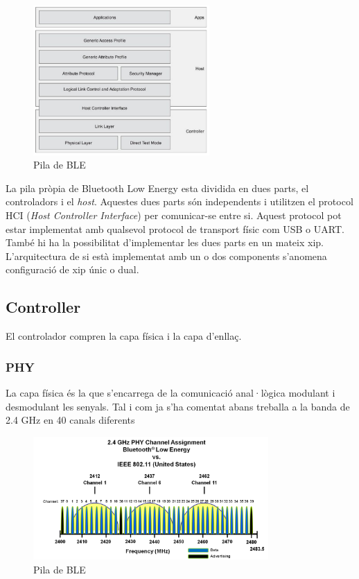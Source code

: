 \begin{figure}[h!]
	\begin{center}
		\includegraphics[width=0.6\textwidth]{./images/BLE_Stack.png}
		\caption{Pila de BLE \cite{ble_stack}}
		\label{ble_stack}
	\end{center}
\end{figure}

La pila pròpia de Bluetooth Low Energy esta dividida en dues parts, el controladors i el \textit{host}. Aquestes dues parts són independents i utilitzen el protocol HCI (\textit{Host Controller Interface}) per comunicar-se entre si. Aquest protocol pot estar implementat amb qualsevol protocol de transport físic com USB o UART. També hi ha la possibilitat d'implementar les dues parts en un mateix xip. L'arquitectura de si està implementat amb un o dos components s'anomena configuració de xip únic o dual.


\subsection{Controller}
El controlador compren la capa física i la capa d'enllaç.

\subsubsection{PHY}
La capa física és la que s'encarrega de la comunicació anal·lògica modulant i desmodulant les senyals.
Tal i com ja s'ha comentat abans treballa a la banda de 2.4 GHz en 40 canals diferents

\begin{figure}[h!]
	\begin{center}
		\includegraphics[width=0.8\textwidth]{./images/ble_channel_assignment.png}
		\caption{Pila de BLE \cite{ble_stack}}
		\label{ble_stack}
	\end{center}
\end{figure}

